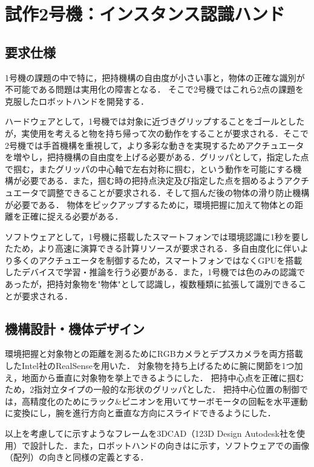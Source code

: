 \chapter{試作2号機：インスタンス認識ハンド}
\newpage

\section{要求仕様}
1号機の課題の中で特に，把持機構の自由度が小さい事と，物体の正確な識別が不可能である問題は実用化の障害となる．
そこで2号機ではこれら2点の課題を克服したロボットハンドを開発する．

ハードウェアとして，1号機では対象に近づきグリップすることをゴールとしたが，実使用を考えると物を持ち帰って次の動作をすることが要求される．そこで2号機では手首機構を重視して，より多彩な動きを実現するためアクチュエータを増やし，把持機構の自由度を上げる必要がある．グリッパとして，指定した点で掴む，またグリッパの中心軸で左右対称に掴む，という動作を可能にする機構が必要である．また，掴む時の把持点決定及び指定した点を掴めるようアクチュエータで調整できることが要求される．そして掴んだ後の物体の滑り防止機構が必要である．
物体をピックアップするために，環境把握に加えて物体との距離を正確に捉える必要がある．

ソフトウェアとして，1号機に搭載したスマートフォンでは環境認識に1秒を要したため，より高速に演算できる計算リソースが要求される．多自由度化に伴いより多くのアクチュエータを制御するため，スマートフォンではなくGPUを搭載したデバイスで学習・推論を行う必要がある．また，1号機では色のみの認識であったが，把持対象物を"物体"として認識し，複数種類に拡張して識別できることが要求される．


\section{機構設計・機体デザイン}
環境把握と対象物との距離を測るためにRGBカメラとデプスカメラを両方搭載したIntel社のRealSenseを用いた．
対象物を持ち上げるために腕に関節を1つ加え，地面から垂直に対象物を挙上できるようにした．
把持中心点を正確に掴むため，2指対立タイプの一般的な形状のグリッパとした．
把持中心位置の制御では，高精度化のためにラック\&ピニオンを用いてサーボモータの回転を水平運動に変換にし，腕を進行方向と垂直な方向にスライドできるようにした．

以上を考慮してに示すようなフレームを3DCAD（123D Design Autodesk社を使用）で設計した．また，ロボットハンドの向きはに示す，ソフトウェアでの画像（配列）の向きと同様の定義とする．

